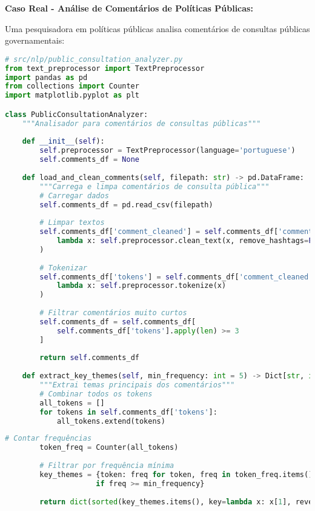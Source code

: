 \begin{researchbox}
\textbf{Caso Real - Análise de Comentários de Políticas Públicas:}

Uma pesquisadora em políticas públicas analisa comentários de consultas públicas governamentais:

\begin{lstlisting}[language=Python]
# src/nlp/public_consultation_analyzer.py
from text_preprocessor import TextPreprocessor
import pandas as pd
from collections import Counter
import matplotlib.pyplot as plt

class PublicConsultationAnalyzer:
    """Analisador para comentários de consultas públicas"""
    
    def __init__(self):
        self.preprocessor = TextPreprocessor(language='portuguese')
        self.comments_df = None
        
    def load_and_clean_comments(self, filepath: str) -> pd.DataFrame:
        """Carrega e limpa comentários de consulta pública"""
        # Carregar dados
        self.comments_df = pd.read_csv(filepath)
        
        # Limpar textos
        self.comments_df['comment_cleaned'] = self.comments_df['comment'].apply(
            lambda x: self.preprocessor.clean_text(x, remove_hashtags=False)
        )
        
        # Tokenizar
        self.comments_df['tokens'] = self.comments_df['comment_cleaned'].apply(
            lambda x: self.preprocessor.tokenize(x)
        )
        
        # Filtrar comentários muito curtos
        self.comments_df = self.comments_df[
            self.comments_df['tokens'].apply(len) >= 3
        ]
        
        return self.comments_df
    
    def extract_key_themes(self, min_frequency: int = 5) -> Dict[str, int]:
        """Extrai temas principais dos comentários"""
        # Combinar todos os tokens
        all_tokens = []
        for tokens in self.comments_df['tokens']:
            all_tokens.extend(tokens)
\end{lstlisting}
\end{researchbox}
\begin{researchbox}
\begin{lstlisting}[language=Python]         
        # Contar frequências
        token_freq = Counter(all_tokens)
        
        # Filtrar por frequência mínima
        key_themes = {token: freq for token, freq in token_freq.items() 
                     if freq >= min_frequency}
        
        return dict(sorted(key_themes.items(), key=lambda x: x[1], reverse=True))
\end{lstlisting}
\end{researchbox}

